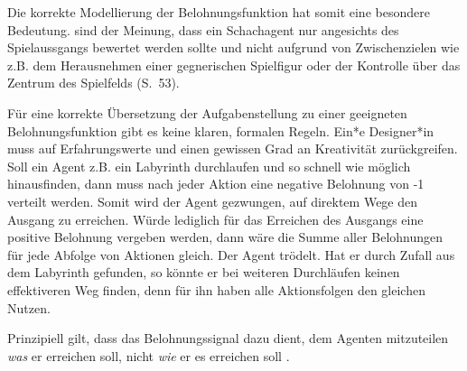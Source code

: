 \par 
Die korrekte Modellierung der Belohnungsfunktion hat somit eine besondere Bedeutung. \cite{Sutton1998} sind der Meinung, dass ein Schachagent nur angesichts des Spielaussgangs bewertet werden sollte und nicht aufgrund von Zwischenzielen wie z.B. dem Herausnehmen einer gegnerischen Spielfigur oder der Kontrolle über das Zentrum des Spielfelds (S.~53). 
\par 
Für eine korrekte Übersetzung der Aufgabenstellung zu einer geeigneten Belohnungsfunktion gibt es keine klaren, formalen Regeln. Ein*e Designer*in muss auf Erfahrungswerte und einen gewissen Grad an Kreativität zurückgreifen. Soll ein Agent z.B. ein Labyrinth durchlaufen und so schnell wie möglich hinausfinden, dann muss nach jeder Aktion eine negative Belohnung von -1 verteilt werden. Somit wird der Agent gezwungen, auf direktem Wege den Ausgang zu erreichen. Würde lediglich für das Erreichen des Ausgangs eine positive Belohnung vergeben werden, dann wäre die Summe aller Belohnungen für jede Abfolge von Aktionen gleich. Der Agent \glqq trödelt\grqq{}. Hat er durch Zufall aus dem Labyrinth gefunden, so könnte er bei weiteren Durchläufen keinen effektiveren Weg finden, denn für ihn haben alle Aktionsfolgen den gleichen Nutzen.
\par
Prinzipiell gilt, dass \glqq das Belohnungssignal dazu dient, dem Agenten mitzuteilen \textit{was} er erreichen soll, nicht \textit{wie} er es erreichen soll\grqq{} \cite[S.~54]{Sutton1998}.